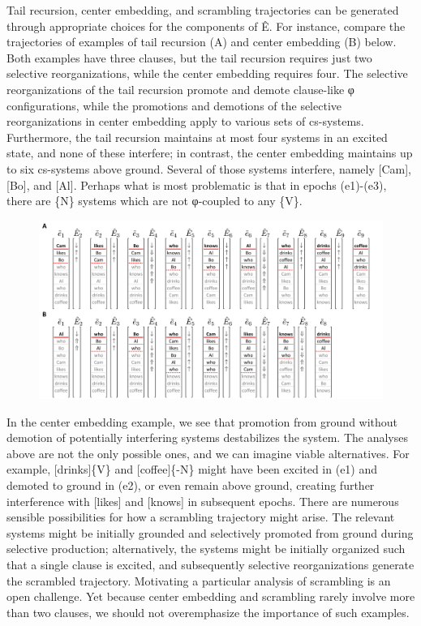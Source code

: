   Tail recursion, center embedding, and scrambling trajectories can be generated through appropriate choices for the components of Ê. For instance, compare the trajectories of examples of tail recursion (A) and center embedding (B) below. Both examples have three clauses, but the tail recursion requires just two selective reorganizations, while the center embedding requires four. The selective reorganizations of the tail recursion promote and demote clause-like φ configurations, while the promotions and demotions of the selective reorganizations in center embedding apply to various sets of cs-systems. Furthermore, the tail recursion maintains at most four systems in an excited state, and none of these interfere; in contrast, the center embedding maintains up to six cs-systems above ground. Several of those systems interfere, namely [Cam], [Bo], and [Al]. Perhaps what is most problematic is that in epochs (e1)-(e3), there are \{N\} systems which are not φ-coupled to any \{V\}.

  
\begin{figure}
\includegraphics[width=\textwidth]{figures/Tilsen-img119.png}
\caption{\missingcaption}
\label{fig:}
\end{figure}
 

  In the center embedding example, we see that promotion from ground without demotion of potentially interfering systems destabilizes the system. The analyses above are not the only possible ones, and we can imagine viable alternatives. For example, [drinks]\{V\} and [coffee]\{-N\} might have been excited in (e1) and demoted to ground in (e2), or even remain above ground, creating further interference with [likes] and [knows] in subsequent epochs. There are numerous sensible possibilities for how a scrambling trajectory might arise. The relevant systems might be initially grounded and selectively promoted from ground during selective production; alternatively, the systems might be initially organized such that a single clause is excited, and subsequently selective reorganizations generate the scrambled trajectory. Motivating a particular analysis of scrambling is an open challenge. Yet because center embedding and scrambling rarely involve more than two clauses, we should not overemphasize the importance of such examples.

